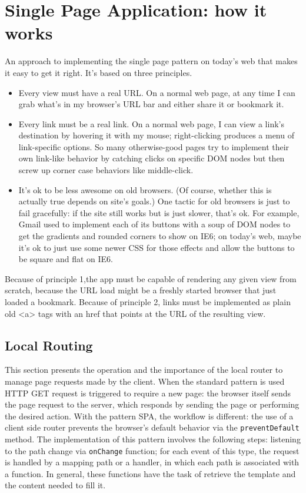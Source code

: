 \section{Single Page Application: how it works}
\label{sec:ARC_function}

An approach to implementing the single page pattern on today's web that makes it easy to get it right. It's based on three principles.
\begin{itemize}
\item Every view must have a real URL. On a normal web page, at any time I can grab what's in my browser's URL bar and either share it or bookmark it.
\item Every link must be a real link. On a normal web page, I can view a link's destination by hovering it with my mouse; right-clicking produces a menu of link-specific options. So many otherwise-good pages try to implement their own link-like behavior by catching clicks on specific DOM nodes but then screw up corner case behaviors like middle-click.
\item It's ok to be less awesome on old browsers. (Of course, whether this is actually true depends on site's goals.) One tactic for old browsers is just to fail gracefully: if the site still works but is just slower, that's ok. For example, Gmail used to implement each of its buttons with a soup of DOM nodes to get the gradients and rounded corners to show on IE6; on today's web, maybe it's ok to just use some newer CSS for those effects and allow the buttons to be square and flat on IE6.
\end{itemize}

Because of principle 1,the  app must be capable of rendering any given view from scratch, because the URL load might be a freshly started browser that just loaded a bookmark. Because of principle 2, links must be implemented as plain old <a> tags with an href that points at the URL of the resulting view.
\cite{arc_tech}

\subsection{Local Routing}

This section presents the operation and the importance of the local router to manage page requests made by the client.
When the standard pattern is used HTTP GET request is triggered to require a new page: the browser itself sends the page request to the server, which responds by sending the page or performing the desired action.
With the pattern SPA, the workflow is different: the use of a client side router prevents the browser's default behavior via the \texttt{preventDefault} method.
The implementation of this pattern involves the following steps: listening to the path change via \texttt{onChange} function; for each event of this type, the request is handled by a mapping path or a handler, in which each path is associated with a function. In general, these functions have the task of retrieve the template and the content needed to fill it.

